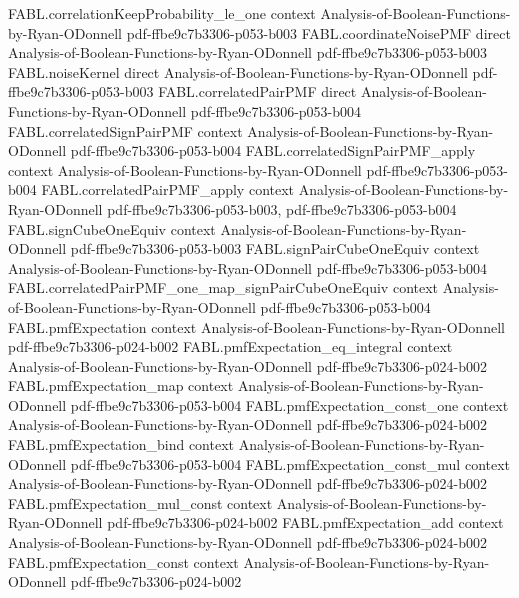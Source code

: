 \begin{theorem}
  {FABL.correlationKeepProbability_le_one}
  {context}
  {Analysis-of-Boolean-Functions-by-Ryan-ODonnell}
  {pdf-ffbe9c7b3306-p053-b003}
\proofstep
  {FABL.coordinateNoisePMF}
  {direct}
  {Analysis-of-Boolean-Functions-by-Ryan-ODonnell}
  {pdf-ffbe9c7b3306-p053-b003}
\proofstep
  {FABL.noiseKernel}
  {direct}
  {Analysis-of-Boolean-Functions-by-Ryan-ODonnell}
  {pdf-ffbe9c7b3306-p053-b003}
\proofstep
  {FABL.correlatedPairPMF}
  {direct}
  {Analysis-of-Boolean-Functions-by-Ryan-ODonnell}
  {pdf-ffbe9c7b3306-p053-b004}
\proofstep
  {FABL.correlatedSignPairPMF}
  {context}
  {Analysis-of-Boolean-Functions-by-Ryan-ODonnell}
  {pdf-ffbe9c7b3306-p053-b004}
\proofstep
  {FABL.correlatedSignPairPMF_apply}
  {context}
  {Analysis-of-Boolean-Functions-by-Ryan-ODonnell}
  {pdf-ffbe9c7b3306-p053-b004}
\proofstep
  {FABL.correlatedPairPMF_apply}
  {context}
  {Analysis-of-Boolean-Functions-by-Ryan-ODonnell}
  {pdf-ffbe9c7b3306-p053-b003,
    pdf-ffbe9c7b3306-p053-b004}
\proofstep
  {FABL.signCubeOneEquiv}
  {context}
  {Analysis-of-Boolean-Functions-by-Ryan-ODonnell}
  {pdf-ffbe9c7b3306-p053-b003}
\proofstep
  {FABL.signPairCubeOneEquiv}
  {context}
  {Analysis-of-Boolean-Functions-by-Ryan-ODonnell}
  {pdf-ffbe9c7b3306-p053-b004}
\proofstep
  {FABL.correlatedPairPMF_one_map_signPairCubeOneEquiv}
  {context}
  {Analysis-of-Boolean-Functions-by-Ryan-ODonnell}
  {pdf-ffbe9c7b3306-p053-b004}
\proofstep
  {FABL.pmfExpectation}
  {context}
  {Analysis-of-Boolean-Functions-by-Ryan-ODonnell}
  {pdf-ffbe9c7b3306-p024-b002}
\proofstep
  {FABL.pmfExpectation_eq_integral}
  {context}
  {Analysis-of-Boolean-Functions-by-Ryan-ODonnell}
  {pdf-ffbe9c7b3306-p024-b002}
\proofstep
  {FABL.pmfExpectation_map}
  {context}
  {Analysis-of-Boolean-Functions-by-Ryan-ODonnell}
  {pdf-ffbe9c7b3306-p053-b004}
\proofstep
  {FABL.pmfExpectation_const_one}
  {context}
  {Analysis-of-Boolean-Functions-by-Ryan-ODonnell}
  {pdf-ffbe9c7b3306-p024-b002}
\proofstep
  {FABL.pmfExpectation_bind}
  {context}
  {Analysis-of-Boolean-Functions-by-Ryan-ODonnell}
  {pdf-ffbe9c7b3306-p053-b004}
\proofstep
  {FABL.pmfExpectation_const_mul}
  {context}
  {Analysis-of-Boolean-Functions-by-Ryan-ODonnell}
  {pdf-ffbe9c7b3306-p024-b002}
\proofstep
  {FABL.pmfExpectation_mul_const}
  {context}
  {Analysis-of-Boolean-Functions-by-Ryan-ODonnell}
  {pdf-ffbe9c7b3306-p024-b002}
\proofstep
  {FABL.pmfExpectation_add}
  {context}
  {Analysis-of-Boolean-Functions-by-Ryan-ODonnell}
  {pdf-ffbe9c7b3306-p024-b002}
\proofstep
  {FABL.pmfExpectation_const}
  {context}
  {Analysis-of-Boolean-Functions-by-Ryan-ODonnell}
  {pdf-ffbe9c7b3306-p024-b002}

\end{theorem}
